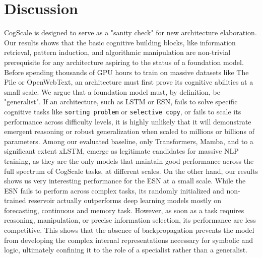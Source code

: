 \documentclass{article}
\begin{document}
\section{Discussion}


CogScale is designed to serve as a "sanity check" for new architecture elaboration. Our results shows that the basic cognitive building blocks, like information retrieval, pattern induction, and algorithmic manipulation are non-trivial prerequisite for any architecture aspiring to the status of a foundation model. Before spending thousands of GPU hours to train on massive datasets like The Pile or OpenWebText, an architecture must first prove its cognitive abilities at a small scale. We argue that a foundation model must, by definition, be "generalist". If an architecture, such as LSTM or ESN, fails to solve specific cognitive tasks like \texttt{sorting problem} or \texttt{selective copy}, or fails to scale its performance across difficulty levels, it is highly unlikely that it will demonstrate emergent reasoning or robust generalization when scaled to millions or billions of parameters. Among our evaluated baseline, only Transformers, Mamba, and to a significant extent xLSTM, emerge as legitimate candidates for massive NLP training, as they are the only models that maintain good performance across the full spectrum of CogScale tasks, at different scales.
On the other hand, our results shows us very interesting performance for the ESN at a small scale. While the ESN fails to perform across complex tasks, its randomly initialized and non-trained reservoir actually outperforms deep learning models mostly on forecasting, continuous and memory task. However, as soon as a task requires reasoning, manipulation, or precise information selection, its performance are less competitive. This shows that the absence of backpropagation prevents the model from developing the complex internal representations necessary for symbolic and logic, ultimately confining it to the role of a specialist rather than a generalist.
\end{document}
